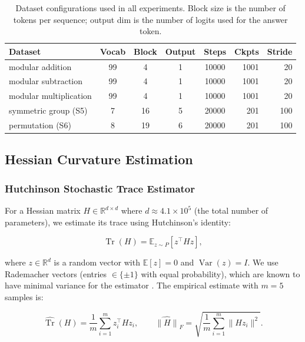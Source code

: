 \documentclass[12pt,twoside]{article}
\newcommand{\Tr}{\operatorname{Tr}}
\newcommand{\Var}{\operatorname{Var}}
\begin{document}
\begin{table}[t]
  \centering
  \caption{Dataset configurations used in all experiments. Block size is the
           number of tokens per sequence; output dim is the number of logits
           used for the answer token.}
  \label{tab:datasets}
  \begin{tabular}{lccccrr}
    \toprule
    Dataset & Vocab & Block & Output & Steps & Ckpts & Stride \\
    \midrule
    modular addition       & 99 & 4  & 1 & 10000 & 1001 & 20 \\
    modular subtraction    & 99 & 4  & 1 & 10000 & 1001 & 20 \\
    modular multiplication & 99 & 4  & 1 & 10000 & 1001 & 20 \\
    symmetric group (S5)   & 7  & 16 & 5 & 20000 & 201  & 100 \\
    permutation (S6)       & 8  & 19 & 6 & 20000 & 201  & 100 \\
    \bottomrule
  \end{tabular}
\end{table}

\subsection{Hessian Curvature Estimation}

\subsubsection{Hutchinson Stochastic Trace Estimator}

For a Hessian matrix \(H \in \mathbb{R}^{d \times d}\) where
\(d \approx 4.1\times 10^5\) (the total number of parameters), we estimate its
trace using Hutchinson's identity:

\begin{equation}
  \Tr(H) = \mathbb{E}_{z \sim P} \left[ z^\top H z \right],
  \label{eq:hutchinson}
\end{equation}

where \(z \in \mathbb{R}^d\) is a random vector with \(\mathbb{E}[z] = 0\) and
\(\Var(z) = I\). We use Rademacher vectors (entries \(\in \{\pm1\}\) with equal
probability), which are known to have minimal variance for the estimator
\citep{hutchinson1990stochastic}. The empirical estimate with \(m = 5\) samples is:

\begin{equation}
  \widehat{\Tr}(H) = \frac{1}{m} \sum_{i=1}^m z_i^\top H z_i,
  \qquad
  \widehat{\|H\|}_F = \sqrt{\frac{1}{m} \sum_{i=1}^m \|H z_i\|^2}.
  \label{eq:hutchinson_emp}
\end{equation}
\end{document}
